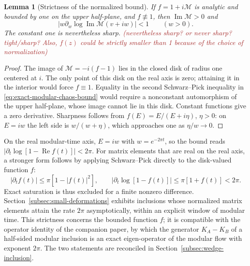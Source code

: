 \documentclass[a4paper,11pt]{article}
\newtheorem{lemma}[theorem]{Lemma}
\theoremstyle{definition}
\newcommand{\KL}[1]{\textcolor{brown}{#1}}
\begin{document}
\begin{lemma}[Strictness of the normalized bound]\label{lem:strict-modular-chaos-bound}
If $f=1+i\mathcal M$ is analytic and bounded by one on the upper half-plane, and $f\not\equiv1$, then $\operatorname{Im}\mathcal M>0$ and
\begin{equation}
 \left|w\partial_w\log\operatorname{Im}\mathcal M(v+iw)\right|<1\qquad(w>0).
 \label{eq:strict-modular-chaos-bound}
\end{equation}
The constant one is nevertheless sharp. \KL{(nevertheless sharp? or never sharp? tight/sharp? Also, $f(z)$ could be strictly smaller than 1 because of the choice of normalization)}
\end{lemma}
\begin{proof}
The image of $\mathcal M=-i(f-1)$ lies in the closed disk of radius one centered at $i$. The only point of this disk on the real axis is zero; attaining it in the interior would force $f\equiv1$. Equality in the second Schwarz--Pick inequality in \eqref{eq:exact-modular-chaos-bound} would require a nonconstant automorphism of the upper half-plane, whose image cannot lie in this disk. Constant functions give a zero derivative. Sharpness follows from $f(E)=E/(E+i\eta)$, $\eta>0$: on $E=iw$ the left side is $w/(w+\eta)$, which approaches one as $\eta/w\to0$.
\end{proof}

On the real modular-time axis, $E=iw$ with $w=e^{-2\pi t}$, so the bound reads $|\partial_t\log[1-\operatorname{Re}f(t)]|<2\pi$. For matrix elements that are real on the real axis, a stronger form follows by applying Schwarz--Pick directly to the disk-valued function $f$:
\begin{equation}
 |\partial_tf(t)|\le\pi[1-|f(t)|^2],\qquad
 \left|\partial_t\log[1-f(t)]\right|\le\pi[1+f(t)]<2\pi .
 \label{eq:real-axis-modular-chaos-bound}
\end{equation}
Exact saturation is thus excluded for a finite nonzero difference. Section~\ref{subsec:small-deformations} exhibits inclusions whose normalized matrix elements attain the rate $2\pi$ asymptotically, within an explicit window of modular time. This strictness concerns the bounded function $f$; it is compatible with the operator identity of the companion paper, by which the generator $K_A-K_B$ of a half-sided modular inclusion is an exact eigen-operator of the modular flow with exponent $2\pi$. The two statements are reconciled in Section~\ref{subsec:wedge-inclusion}.

\end{document}
